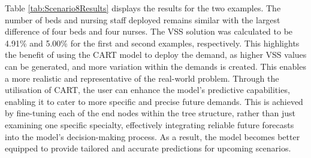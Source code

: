 \documentclass[../thesis.tex]{subfiles}
\begin{document}
Table \ref{tab:Scenario8Results} displays the results for the two examples. The number of beds and nursing staff deployed remains similar with the largest difference of four beds and four nurses. The VSS solution was calculated to be 4.91\% and 5.00\% for the first and second examples, respectively. This highlights the benefit of using the CART model to deploy the demand, as higher VSS values can be generated, and more variation within the demands is created. This enables a more realistic and representative of the real-world problem. Through the utilisation of CART, the user can enhance the model's predictive capabilities, enabling it to cater to more specific and precise future demands. This is achieved by fine-tuning each of the end nodes within the tree structure, rather than just examining one specific specialty, effectively integrating reliable future forecasts into the model's decision-making process. As a result, the model becomes better equipped to provide tailored and accurate predictions for upcoming scenarios.
\begin{table}[h!]
    \centering{}
    \caption{The EV, RP and EEV values for the $x^\textnormal{bed}$, $u^\textnormal{bed}$, $x^\textnormal{staff}$, $u^\textnormal{staff}$ decision variables and objective function for Scenario 7 with a 10\% increase in demand for T\&O services. Example 1 is the case where the overall average demand is increased by 10\% and Example 2 is targeting T\&O only nodes within the regression tree and increasing the demand by 10\%.}
    \label{tab:Scenario8Results}
\end{table}
\end{document}
